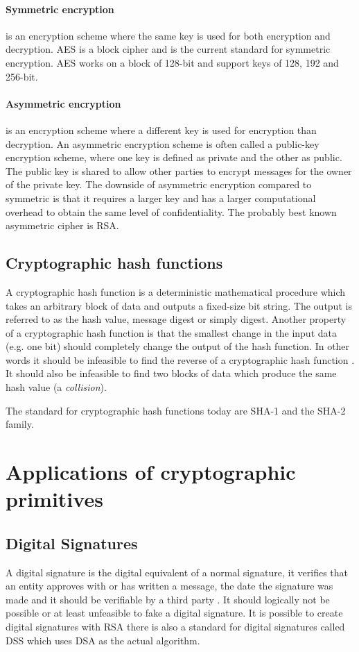\documentclass[english,12pt,a4paper]{book}
\begin{document}
\paragraph{Symmetric encryption} is an encryption scheme where the same key is
used for both encryption and decryption\cite[p. 32]{stallings}. \ac{AES} is a
block cipher and is the current standard for symmetric encryption. \ac{AES}
works on a block of 128-bit and support keys of 128, 192 and 256-bit. 


\paragraph{Asymmetric encryption} is an encryption scheme where a different key
is used for encryption than decryption\cite[p. 259]{stallings}. An asymmetric
encryption scheme is often called a public-key encryption scheme, where one key
is defined as private and the other as public. The public key is shared to
allow other parties to encrypt messages for the owner of the private key. The
downside of asymmetric encryption compared to symmetric is that it requires a
larger key and has a larger computational overhead to obtain the same level of
confidentiality. The probably best known asymmetric cipher is \ac{RSA}.

\subsection{Cryptographic hash functions}
A cryptographic hash function is a deterministic mathematical procedure which
takes an arbitrary block of data and outputs a fixed-size bit string. The output
is referred to as the hash value, message digest or simply digest.
Another property of a cryptographic hash function is that the smallest change in
the input data (e.g. one bit) should completely change the output of the hash
function. In other words it should be infeasible to find the reverse of a
cryptographic hash function \cite[p. 335]{stallings}. It should also be infeasible to
find two blocks of data which produce the same hash value (a \emph{collision}).

The standard for cryptographic hash functions today are \ac{SHA}-1 and the
\ac{SHA}-2 family.

\section{Applications of cryptographic primitives}

\subsection{Digital Signatures}
A digital signature is the digital equivalent of a normal signature, it
verifies that an entity approves with or has written a message, the date the
signature was made and it should be verifiable by a third party \cite[p.
379]{schneier}. It should logically not be possible or at least unfeasible to
fake a digital signature. It is possible to create digital signatures with
\ac{RSA} there is also a standard for digital signatures called \ac{DSS} which
uses \ac{DSA} as the actual algorithm.
\end{document}
